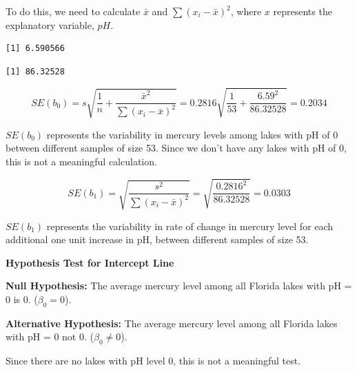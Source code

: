 \documentclass[
  letterpaper,
  DIV=11,
  numbers=noendperiod]{scrreprt}
\newenvironment{Shaded}{\begin{snugshade}}{\end{snugshade}}
\newcommand{\DecValTok}[1]{\textcolor[rgb]{0.68,0.00,0.00}{#1}}
\newcommand{\FunctionTok}[1]{\textcolor[rgb]{0.28,0.35,0.67}{#1}}
\newcommand{\NormalTok}[1]{\textcolor[rgb]{0.00,0.23,0.31}{#1}}
\newcommand{\SpecialCharTok}[1]{\textcolor[rgb]{0.37,0.37,0.37}{#1}}
\begin{document}
To do this, we need to calculate \(\bar{x}\) and
\(\sum(x_i-\bar{x})^2\), where \(x\) represents the explanatory
variable, \(pH\).

\begin{Shaded}
\end{Shaded}

\begin{verbatim}
[1] 6.590566
\end{verbatim}

\begin{Shaded}
\end{Shaded}

\begin{verbatim}
[1] 86.32528
\end{verbatim}

\[ SE(b_0)=s\sqrt{\frac{1}{n}+\frac{\bar{x}^2}{\sum(x_i-\bar{x})^2}} = 0.2816\sqrt{\frac{1}{53} + \frac{6.59^2}{86.32528} } = 0.2034 \]

\(SE(b_0)\) represents the variability in mercury levels among lakes
with pH of 0 between different samples of size 53. Since we don't have
any lakes with pH of 0, this is not a meaningful calculation.

\[ SE(b_1)=\sqrt{\frac{s^2}{\sum(x_i-\bar{x})^2}}=\sqrt{\frac{0.2816^2}{86.32528}} = 0.0303 \]

\(SE(b_1)\) represents the variability in rate of change in mercury
level for each additional one unit increase in pH, between different
samples of size 53.

\textbf{Hypothesis Test for Intercept Line}

\textbf{Null Hypothesis:} The average mercury level among all Florida
lakes with pH = 0 is 0. (\(\beta_0=0\)).

\textbf{Alternative Hypothesis:} The average mercury level among all
Florida lakes with pH = 0 not 0. (\(\beta_0 \neq 0\)).

Since there are no lakes with pH level 0, this is not a meaningful test.
\end{document}
